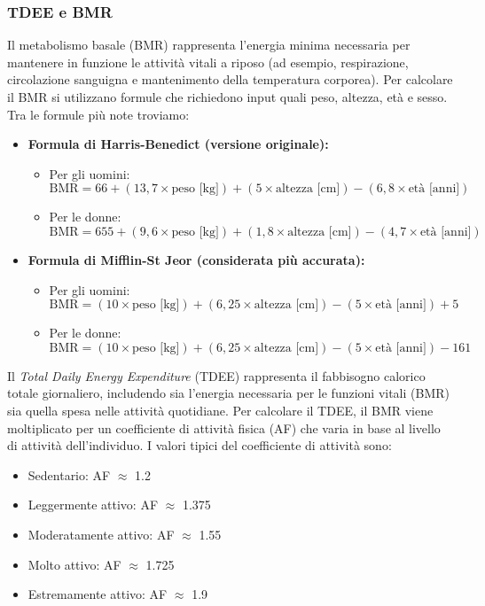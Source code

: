 \documentclass[11pt,a4paper]{article}
\begin{document}
\subsubsection{TDEE e BMR}
Il metabolismo basale (BMR) rappresenta l’energia minima necessaria per mantenere in funzione le attività vitali a riposo (ad esempio, respirazione, circolazione sanguigna e mantenimento della temperatura corporea). Per calcolare il BMR si utilizzano formule che richiedono input quali peso, altezza, età e sesso. Tra le formule più note troviamo: 
\begin{itemize}
  \item \textbf{Formula di Harris-Benedict (versione originale):}
    \begin{itemize}
      \item Per gli uomini: 
        \[
        \text{BMR} = 66 + (13,7 \times \text{peso [kg]}) + (5 \times \text{altezza [cm]}) - (6,8 \times \text{età [anni]})
        \]
      \item Per le donne: 
        \[
        \text{BMR} = 655 + (9,6 \times \text{peso [kg]}) + (1,8 \times      \text{altezza [cm]}) - (4,7 \times \text{età [anni]})
        \]
    \end{itemize}
  \item \textbf{Formula di Mifflin-St Jeor (considerata più accurata):}
    \begin{itemize}
      \item Per gli uomini: 
        \[
        \text{BMR} = (10 \times \text{peso [kg]}) + (6,25 \times \text{altezza [cm]}) - (5 \times \text{età [anni]}) + 5
        \]
      \item Per le donne: 
        \[
        \text{BMR} = (10 \times \text{peso [kg]}) + (6,25 \times \text{altezza [cm]}) - (5 \times \text{età [anni]}) - 161
        \]
    \end{itemize}
\end{itemize}
Il \textit{Total Daily Energy Expenditure} (TDEE) rappresenta il fabbisogno calorico totale giornaliero, includendo sia l'energia necessaria per le funzioni vitali (BMR) sia quella spesa nelle attività quotidiane. Per calcolare il TDEE, il BMR viene moltiplicato per un coefficiente di attività fisica (AF) che varia in base al livello di attività dell'individuo. I valori tipici del coefficiente di attività sono:
\begin{itemize}
  \item Sedentario: AF $\approx$ 1.2
  \item Leggermente attivo: AF $\approx$ 1.375
  \item Moderatamente attivo: AF $\approx$ 1.55
  \item Molto attivo: AF $\approx$ 1.725
  \item Estremamente attivo: AF $\approx$ 1.9
\end{itemize}
\end{document}
